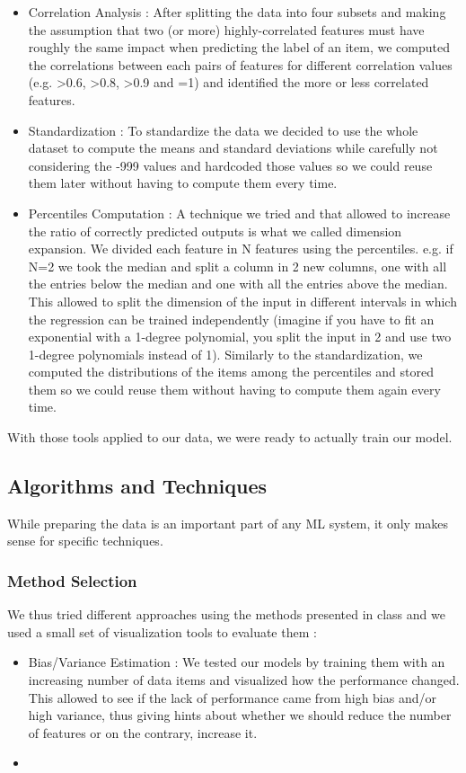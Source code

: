 \documentclass[10pt,conference,compsocconf]{IEEEtran}
\begin{document}
\begin{itemize}
\item Correlation Analysis :
After splitting the data into four subsets and making the assumption that two (or more) highly-correlated features must have roughly the same impact when predicting the label of an item, we computed the correlations between each pairs of features for different correlation values (e.g. >0.6, >0.8, >0.9 and =1) and identified the more or less correlated features.


\item Standardization :
To standardize the data we decided to use the whole dataset to compute the means and standard deviations while carefully not considering the -999 values and hardcoded those values so we could reuse them later without having to compute them every time. 

\item Percentiles Computation :
A technique we tried and that allowed to increase the ratio of correctly predicted outputs is what we called dimension expansion. We divided each feature in N features using the percentiles. e.g. if N=2 we took the median and split a column in 2 new columns, one with all the entries below the median and one with all the entries above the median. This allowed to split the dimension of the input in different intervals in which the regression can be trained independently (imagine if you have to fit an exponential with a 1-degree polynomial, you split the input in 2 and use two 1-degree polynomials instead of 1). Similarly to the standardization, we computed the distributions of the items among the percentiles and stored them so we could reuse them without having to compute them again every time.

\end{itemize}

With those tools applied to our data, we were ready to actually  train our model.

\subsection{Algorithms and Techniques}
While preparing the data is an important part of any ML system, it only makes sense for specific techniques. 
\subsubsection{Method Selection}
We thus tried different approaches using the methods presented in class and we used a small set of visualization tools to evaluate them :
\begin{itemize}
\item Bias/Variance Estimation :
We tested our models by training them with an increasing number of data items and visualized how the performance changed. This allowed to see if the lack of performance came from high bias and/or high variance, thus giving hints about whether we should reduce the number of features or on the contrary, increase it.

\item 
\end{itemize}
\end{document}
